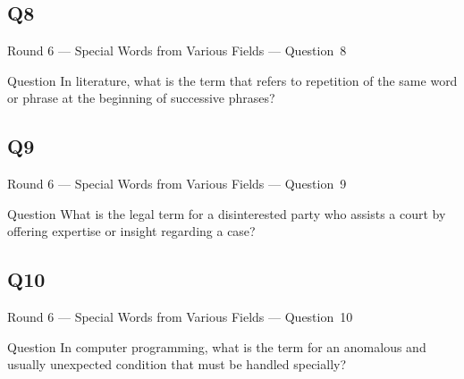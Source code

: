 \documentclass[11pt]{beamer}
\begin{document}
\subsection*{Q8}
\begin{frame}[t]{Round 6 --- Special Words from Various Fields --- \mbox{Question 8}}
\vspace{-0.5em}
\begin{block}{Question}
In literature, what is the term that refers to repetition of the same word or phrase at the beginning of successive phrases?
\end{block}
\end{frame}
\subsection*{Q9}
\begin{frame}[t]{Round 6 --- Special Words from Various Fields --- \mbox{Question 9}}
\vspace{-0.5em}
\begin{block}{Question}
What is the legal term for a disinterested party who assists a court by offering expertise or insight regarding a case?
\end{block}
\end{frame}
\subsection*{Q10}
\begin{frame}[t]{Round 6 --- Special Words from Various Fields --- \mbox{Question 10}}
\vspace{-0.5em}
\begin{block}{Question}
In computer programming, what is the term for an anomalous and usually unexpected condition that must be handled specially?
\end{block}
\end{frame}
\end{document}
